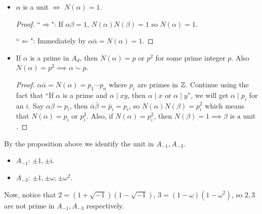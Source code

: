 
\begin{prop}
  \begin{itemize}
    \item $\alpha$ is a unit $\iff$ $N(\alpha) = 1$.
      \begin{proof}
        ``$\Rightarrow$": If $\alpha \beta = 1$, $N(\alpha) N(\beta) = 1$ so $N(\alpha) = 1$.

        ``$\Leftarrow$": Immediately by $\alpha \bar{\alpha} = N(\alpha) = 1$.
      \end{proof}
    \item If $\alpha$ is a prime in $A_d$, then $N(\alpha) = p \text{ or } p^2$
      for some prime integer $p$. Also $N(\alpha) = p^2 \implies \alpha \sim p$.
      \begin{proof}
        $\alpha \bar{\alpha} = N(\alpha) = p_1 \dotsm p_n$ where $p_i$ are
        primes in $\mathbb{Z}$. Continue using the fact that ``If $\alpha$
        is a prime and $\alpha \mid xy$, then $\alpha \mid x$ or $\alpha \mid y$'',
        we will get $\alpha \mid p_i$ for an $i$. Say $\alpha \beta = p_i$,
        then $\bar{\alpha}\bar{\beta} = \bar{p}_i = p_i$,
        so $N(\alpha) N(\beta) = p_i^2$ which means that $N(\alpha) = p_i \text{ or } p_i^2$.
        Also, if $N(\alpha) = p_i^2$, then $N(\beta) = 1 \implies \beta \text{ is a unit }$.
      \end{proof}
  \end{itemize}
\end{prop}

By the proposition above we identify the unit in $A_{-1}, A_{-3}$.
\begin{itemize}
  \item $A_{-1}$: $\pm 1, \pm \mathrm{i}$.
  \item $A_{-3}$: $\pm 1, \pm \omega, \pm \omega^2$.
\end{itemize}

Now, notice that $2 = (1 + \sqrt{-1})(1 - \sqrt{-1})$, $3 = (1 - \omega) (1 - \omega^2)$,
so $2, 3$ are not prime in $A_{-1}, A_{-3}$ respectively.


